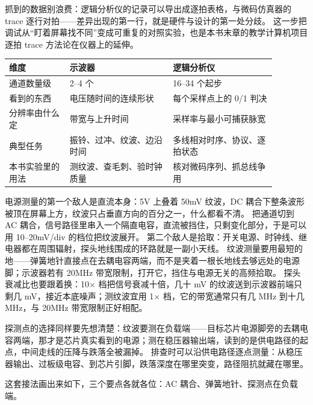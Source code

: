 抓到的数据别浪费：逻辑分析仪的记录可以导出成逐拍表格，与微码仿真器的 trace 逐行对拍——差异出现的第一行，就是硬件与设计的第一处分歧。
这一步把调试从“盯着屏幕找不同”变成可重复的对照实验，也是本书末章的教学计算机项目逐拍 trace 方法论在仪器上的延伸。

\begin{longtable}{L{0.20\linewidth}L{0.34\linewidth}L{0.34\linewidth}}
\toprule
维度 & 示波器 & 逻辑分析仪 \\
\midrule
通道数量级 & 2--4 个 & 16--34 个起步 \\\tablerowrule
看到的东西 & 电压随时间的连续形状 & 每个采样点上的 0/1 判决 \\\tablerowrule
分辨率由什么定 & 带宽与上升时间 & 采样率与最小可捕获脉宽 \\\tablerowrule
典型任务 & 振铃、过冲、纹波、边沿时间 & 多线相对时序、协议、逐拍状态 \\\tablerowrule
本书实验里的用法 & 测纹波、查毛刺、验时钟质量 & 核对微码序列、抓总线争用 \\
\bottomrule
\end{longtable}

电源测量的第一个敌人是直流本身：5V 上叠着 50mV 纹波，DC 耦合下整条波形被顶在屏幕上方，纹波只占垂直方向的百分之一，什么都看不清。
把通道切到 AC 耦合，信号路径里串入一个隔直电容，直流被挡住，只剩变化部分，于是可以用 10--20mV/div 的档位把纹波展开。
第二个敌人是拾取：开关电源、时钟线、继电器都在周围辐射，探头地线围成的环路就是一副小天线。
纹波测量要用最短的地——弹簧地针直接点在去耦电容两端，而不是夹着一根长地线去够远处的电源脚；示波器若有 20MHz 带宽限制，打开它，挡住与电源无关的高频拾取。
探头衰减比也要跟着换：10$\times$ 档把信号衰减十倍，几十 mV 的纹波送到示波器前端只剩几 mV，接近本底噪声；测纹波宜用 1$\times$ 档，它的带宽通常只有几 MHz 到十几 MHz，与 20MHz 带宽限制正好相配。

探测点的选择同样要先想清楚：纹波要测在负载端——目标芯片电源脚旁的去耦电容两端，那才是芯片真实看到的电源；测在稳压器输出端，读到的是供电路径的起点，中间走线的压降与跌落全被漏掉。
排查时可以沿供电路径逐点测量：从稳压器输出、过板级电容、到芯片引脚，跌落深度在哪里突变，路径阻抗就藏在哪里。

这套接法画出来如下，三个要点各就各位：AC 耦合、弹簧地针、探测点在负载端。

